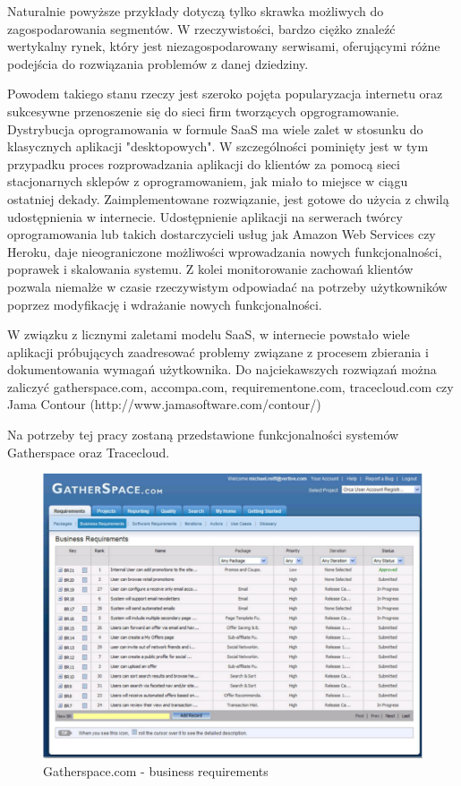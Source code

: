       Naturalnie powyższe przykłady dotyczą tylko skrawka możliwych do zagospodarowania segmentów. W rzeczywistości, bardzo ciężko znaleźć wertykalny rynek, który jest niezagospodarowany serwisami, oferującymi różne podejścia do rozwiązania problemów z danej dziedziny. 

      Powodem takiego stanu rzeczy jest szeroko pojęta popularyzacja internetu oraz sukcesywne przenoszenie się do sieci firm tworzących opgrogramowanie. Dystrybucja oprogramowania w formule SaaS ma wiele zalet w stosunku do klasycznych aplikacji "desktopowych". W szczególności pominięty jest w tym przypadku proces rozprowadzania aplikacji do klientów za pomocą sieci stacjonarnych sklepów z oprogramowaniem, jak miało to miejsce w ciągu ostatniej dekady. Zaimplementowane rozwiązanie, jest gotowe do użycia z chwilą udostępnienia w internecie. Udostępnienie aplikacji na serwerach twórcy oprogramowania lub takich dostarczycieli usług jak Amazon Web Services czy Heroku, daje nieograniczone możliwości wprowadzania nowych funkcjonalności, poprawek i skalowania systemu. Z kolei monitorowanie zachowań klientów pozwala niemalże w czasie rzeczywistym odpowiadać na potrzeby użytkowników poprzez modyfikację i wdrażanie nowych funkcjonalności. 

      W związku z licznymi zaletami modelu SaaS, w internecie powstało wiele aplikacji próbujących zaadresować problemy związane z procesem zbierania i dokumentowania wymagań użytkownika. Do najciekawszych rozwiązań można zaliczyć gatherspace.com, accompa.com, requirementone.com, tracecloud.com czy Jama Contour (http://www.jamasoftware.com/contour/)
    
      Na potrzeby tej pracy zostaną przedstawione funkcjonalności systemów Gatherspace oraz Tracecloud.

      \begin{figure}[t]
        \centering
        \includegraphics[width=1.0\textwidth]{img/gatherspace_1.pdf}
        \caption{Gatherspace.com - business requirements}
        \label{fig:gatherspace_1}
      \end{figure}


